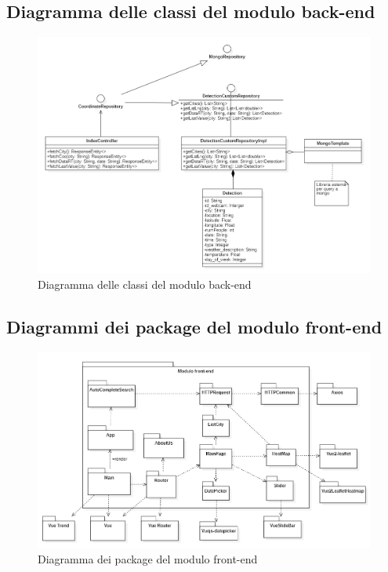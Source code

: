 \subsection{Diagramma delle classi del modulo back-end}\label{DiagrammaClassiRestApi}
\begin{center}
	\begin{figure}[H]
		\centering\includegraphics[scale=0.65]{../immagini/diag_PB/diag_class_spring.png}
		\caption{Diagramma delle classi del modulo back-end}
	\end{figure}
\end{center}
\subsection{Diagrammi dei package del modulo front-end}\label{DiagrammaPackageFrontEnd}
\begin{center}
	\begin{figure}[H]
		\centering\includegraphics[scale=0.7]{../immagini/diag_PB/diag_pack_vue.png}
		\caption{Diagramma dei package del modulo front-end}
	\end{figure}
\end{center}
